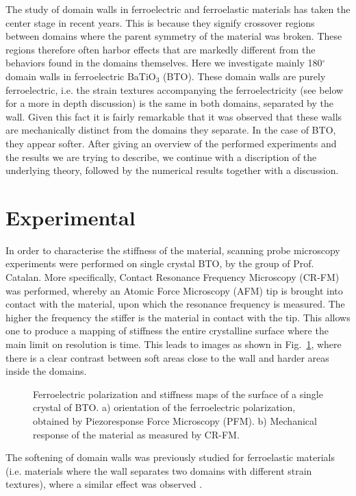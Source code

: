 The study of domain walls in ferroelectric and ferroelastic materials has taken the center stage in recent years. This is because they signify crossover regions between domains where the parent symmetry of the material was broken. These regions therefore often harbor effects that are markedly different from the behaviors found in the domains themselves. Here we investigate mainly 180$^\circ$ domain walls in ferroelectric BaTiO$_3$ (BTO).
These domain walls are purely ferroelectric, i.e. the strain textures accompanying the ferroelectricity (see below for a more in depth discussion) is the same in both domains, separated by the wall. Given this fact it is fairly remarkable that it was observed that these walls are mechanically distinct from the domains they separate. In the case of BTO, they appear softer.
After giving an overview of the performed experiments and the results we are trying to describe, we continue with a discription of the underlying theory, followed by the numerical results together with a discussion.


\section{Experimental}
In order to characterise the stiffness of the material, scanning probe microscopy experiments were performed on single crystal BTO, by the group of Prof. Catalan. More specifically, Contact Resonance Frequency Microscopy (CR-FM) was performed, whereby an Atomic Force Microscopy (AFM) tip is brought into contact with the material, upon which the resonance frequency is measured. The higher the frequency the stiffer is the material in contact with the tip. This allows one to produce a mapping of stiffness the entire crystalline surface where the main limit on resolution is time. This leads to images as shown in Fig.~\ref{fig:BTO_experiment}, where there is a clear contrast between soft areas close to the wall and harder areas inside the domains.
\begin{figure}
	\caption{\label{fig:BTO_experiment} Ferroelectric polarization and stiffness maps of the surface of a single crystal of BTO. a) orientation of the ferroelectric polarization, obtained by Piezoresponse Force Microscopy (PFM). b) Mechanical response of the material as measured by CR-FM.}
\end{figure}
The softening of domain walls was previously studied for ferroelastic materials (i.e. materials where the wall separates two domains with different strain textures), where a similar effect was observed \cite{Lee2003}.


